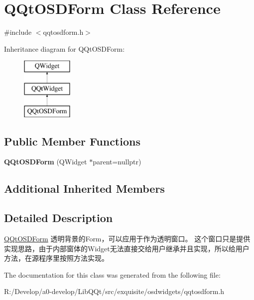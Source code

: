 \hypertarget{class_q_qt_o_s_d_form}{}\section{Q\+Qt\+O\+S\+D\+Form Class Reference}
\label{class_q_qt_o_s_d_form}


{\ttfamily \#include $<$qqtosdform.\+h$>$}

Inheritance diagram for Q\+Qt\+O\+S\+D\+Form\+:\begin{figure}[H]
\begin{center}
\leavevmode
\includegraphics[height=3.000000cm]{class_q_qt_o_s_d_form}
\end{center}
\end{figure}
\subsection*{Public Member Functions}
\begin{DoxyCompactItemize}
\item 
\mbox{\label{class_q_qt_o_s_d_form_ad22cb27058db3065fb1aae3c6ef138e0}} 
{\bfseries Q\+Qt\+O\+S\+D\+Form} (Q\+Widget $\ast$parent=nullptr)
\end{DoxyCompactItemize}
\subsection*{Additional Inherited Members}


\subsection{Detailed Description}
\mbox{\hyperlink{class_q_qt_o_s_d_form}{Q\+Qt\+O\+S\+D\+Form}} 透明背景的\+Form，可以应用于作为透明窗口。 这个窗口只是提供实现思路，由于内部窗体的\+Widget无法直接交给用户继承并且实现，所以给用户方法，在源程序里按照方法实现。 

The documentation for this class was generated from the following file\+:\begin{DoxyCompactItemize}
\item 
R\+:/\+Develop/a0-\/develop/\+Lib\+Q\+Qt/src/exquisite/osdwidgets/qqtosdform.\+h\end{DoxyCompactItemize}
